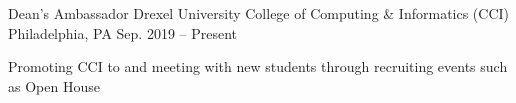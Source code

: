 
\begin{cventries}

  \cventry
  {Dean's Ambassador} %
  {Drexel University College of Computing \& Informatics (CCI)} %
  {Philadelphia, PA} %
  {Sep. 2019 -- Present} %
  {
    \begin{cvitems}
      \item{Promoting CCI to and meeting with new students through recruiting events such as Open House}
    \end{cvitems}
  } %


\end{cventries}
